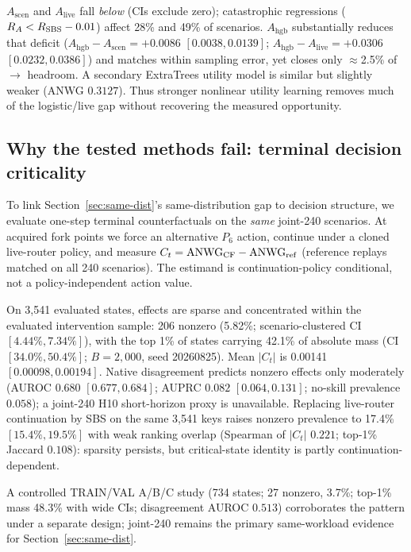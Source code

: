 \documentclass[runningheads]{llncs}
\begin{document}
$A_{\text{scen}}$ and $A_{\text{live}}$ fall \emph{below} \sbs{} (CIs exclude
zero); catastrophic regressions ($R_A<R_{\mathrm{SBS{}}}-0.01$) affect 28\%
and 49\% of scenarios. $A_{\mathrm{hgb}}$ substantially reduces that deficit
($A_{\mathrm{hgb}}-A_{\text{scen}}=+0.0086$ $[0.0038,0.0139]$;
$A_{\mathrm{hgb}}-A_{\text{live}}=+0.0306$ $[0.0232,0.0386]$) and matches
\sbs{} within sampling error, yet closes only $\approx$2.5\% of
\sbs{}$\rightarrow$\vbs{} headroom. A secondary ExtraTrees utility model is
similar but slightly weaker (ANWG $0.3127$). Thus stronger nonlinear
utility learning removes much of the logistic/live gap without recovering the
measured opportunity.

\subsection{Why the tested methods fail: terminal decision criticality}
\label{sec:terminal-crit}

To link Section~\ref{sec:same-dist}'s same-distribution gap to decision
structure, we evaluate one-step terminal counterfactuals on the
\emph{same} joint-240 scenarios. At acquired fork points we force an
alternative $P_6$ action, continue under a cloned live-router policy, and
measure
$C_t=\mathrm{ANWG{}}_{\mathrm{CF}}-\mathrm{ANWG{}}_{\mathrm{ref}}$
(reference replays matched on all 240 scenarios). The estimand is
continuation-policy conditional, not a policy-independent action value.

On 3{,}541 evaluated states, effects are sparse and concentrated within the
evaluated intervention sample: 206 nonzero (5.82\%;
scenario-clustered CI $[4.44\%,7.34\%]$), with the top 1\% of states carrying
42.1\% of absolute mass (CI $[34.0\%,50.4\%]$; $B=2{,}000$, seed 20260825).
Mean $|C_t|$ is 0.00141 $[0.00098,0.00194]$. Native disagreement predicts
nonzero effects only moderately
(AUROC $0.680$ $[0.677,0.684]$;
AUPRC $0.082$ $[0.064,0.131]$; no-skill prevalence $0.058$);
a joint-240 H10 short-horizon proxy is unavailable.
Replacing live-router continuation by SBS on the same 3{,}541 keys raises
nonzero prevalence to 17.4\% $[15.4\%,19.5\%]$ with weak ranking overlap
(Spearman of $|C_t|$ $0.221$; top-1\% Jaccard $0.108$): sparsity persists,
but critical-state identity is partly continuation-dependent.

A controlled TRAIN/VAL A/B/C study (734 states; 27 nonzero, 3.7\%;
top-1\% mass 48.3\% with wide CIs; disagreement AUROC $0.513$)
corroborates the pattern under a separate design; joint-240 remains the
primary same-workload evidence for Section~\ref{sec:same-dist}.
\end{document}

